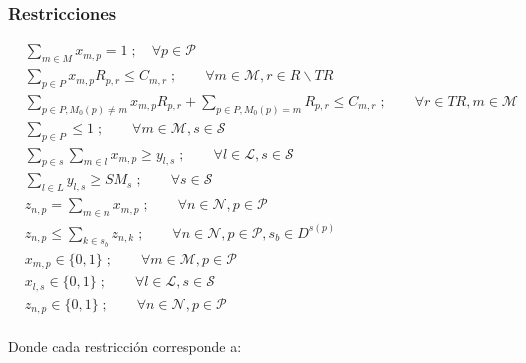 \subsubsection{Restricciones}
\begin{align}
	\label{modelo1:r1} &\sum_{m \in M}x_{m,p} = 1\;; \quad \forall p \in \mathcal{P} \\ 
	\label{modelo1:r2} &\sum_{p \in P}x_{m,p}R_{p,r} \leq C_{m,r}\;; \qquad \forall m \in \mathcal{M}, r \in R\backslash TR \\
	\label{modelo1:r3} &\sum_{p \in P, M_0(p)\neq m}x_{m,p}R_{p,r}+\sum_{p\in P, M_0(p)=m}R_{p,r} \leq C_{m,r}\;; \qquad \forall r \in TR, m \in \mathcal{M} \\
	\label{modelo1:r4} &\sum_{p \in P} \leq 1\;; \qquad \forall m \in \mathcal{M}, s \in \mathcal{S} \\
	\label{modelo1:r5} &\sum_{p \in s}\sum_{m \in l}x_{m,p} \geq y_{l,s}\;; \qquad \forall l \in \mathcal{L}, s \in \mathcal{S} \\
	\label{modelo1:r6} &\sum_{l \in L}y_{l,s} \geq SM_{s}\;; \qquad \forall s \in \mathcal{S} \\
	\label{modelo1:r7} & z_{n,p} = \sum_{m \in n}x_{m,p}\;; \qquad \forall n \in \mathcal{N}, p \in \mathcal{P} \\
	\label{modelo1:r8} & z_{n,p} \leq \sum_{k \in s_b}z_{n,k}\;; \qquad \forall n \in \mathcal{N}, p \in \mathcal{P}, s_b \in D^{s(p)} \\
	\label{modelo1:r9} & x_{m,p} \in \{0,1\}\;; \qquad \forall m \in \mathcal{M}, p \in \mathcal{P} \\
	\label{modelo1:r10} & x_{l,s} \in \{0,1\}\;; \qquad \forall l \in \mathcal{L}, s \in \mathcal{S} \\
	\label{modelo1:r11} & z_{n,p} \in \{0,1\}\;; \qquad \forall n \in \mathcal{N}, p \in \mathcal{P}
\end{align}
\\
Donde cada restricción corresponde a:
